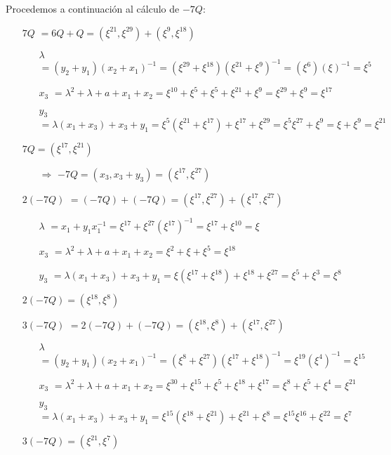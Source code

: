 \documentclass[fleqn]{article}
\begin{document}
    Procedemos a continuación al cálculo de $-7Q$:

    \begin{itemize}
        \item[$7Q$] $ = 6Q + Q = (\xi^{21}, \xi^{29}) + (\xi^9, \xi^{18})$
            \begin{itemize}
                \item[$\lambda$] $ = (y_2 + y_1)(x_2 + x_1)^{-1} = (\xi^{29} + \xi^{18})(\xi^{21} + \xi^{9})^{-1} = (\xi^{6})(\xi)^{-1} = \xi^{5}$
                \item[$x_3$] $ = \lambda^2 + \lambda + a + x_1 + x_2 = \xi^{10} + \xi^{5} + \xi^{5} + \xi^{21} + \xi^{9} = \xi^{29} + \xi^{9} = \xi^{17}$
                \item[$y_3$] $ = \lambda(x_1 + x_3) + x_3 + y_1 = \xi^{5} (\xi^{21} + \xi^{17}) + \xi^{17} + \xi^{29} = \xi^{5} \xi^{27} + \xi^{9} = \xi + \xi^{9} = \xi^{21}$
            \end{itemize}
            $7Q = (\xi^{17}, \xi^{21})$
            \begin{itemize}
                \item[$\Rightarrow$] $-7Q = (x_3, x_3 + y_3) = (\xi^{17}, \xi^{27})$
            \end{itemize}
        \item[$2(-7Q)$] $ = (-7Q) + (-7Q) = (\xi^{17}, \xi^{27}) + (\xi^{17}, \xi^{27})$
            \begin{itemize}
                \item[$\lambda$] $ = x_1 + y_1x_1^{-1} = \xi^{17} + \xi^{27} (\xi^{17})^{-1} = \xi^{17} + \xi^{10} = \xi$
                \item[$x_3$] $ = \lambda^2 + \lambda + a + x_1 + x_2 = \xi^{2} + \xi + \xi^{5} = \xi^{18}$
                \item[$y_3$] $ = \lambda(x_1 + x_3) + x_3 + y_1 = \xi (\xi^{17} + \xi^{18}) + \xi^{18} + \xi^{27} = \xi^{5} + \xi^{3} = \xi^{8}$
            \end{itemize}
            $2(-7Q) = (\xi^{18}, \xi^{8})$
        \item[$3(-7Q)$] $ = 2(-7Q) + (-7Q) = (\xi^{18}, \xi^{8}) + (\xi^{17}, \xi^{27})$
            \begin{itemize}
                \item[$\lambda$] $ = (y_2 + y_1)(x_2 + x_1)^{-1} = (\xi^{8} + \xi^{27}) (\xi^{17} + \xi^{18})^{-1} = \xi^{19} (\xi^{4})^{-1} = \xi^{15}$
                \item[$x_3$] $ = \lambda^2 + \lambda + a + x_1 + x_2 = \xi^{30} + \xi^{15} + \xi^{5} + \xi^{18} + \xi^{17} = \xi^{8} + \xi^{5} + \xi^{4} = \xi^{21}$
                \item[$y_3$] $ = \lambda(x_1 + x_3) + x_3 + y_1 = \xi^{15} (\xi^{18} + \xi^{21}) + \xi^{21} + \xi^{8} = \xi^{15}\xi^{16} + \xi^{22} = \xi^{7}$
            \end{itemize}
            $3(-7Q) = (\xi^{21}, \xi^{7})$

    \end{itemize}
\end{document}
